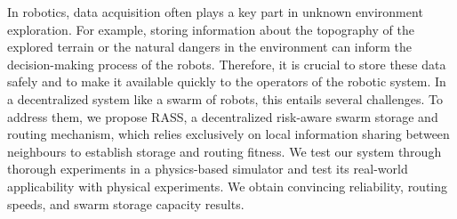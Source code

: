 \label{sec:Theme1}



In robotics, data acquisition often plays a key part in
unknown environment exploration. For example, storing information about the topography of the explored terrain or the natural dangers in the environment can
inform the decision-making process of the robots. 
Therefore, it is crucial to store these data safely
and to make it available quickly to the operators of the robotic
system. In a decentralized system like a swarm of robots, this
entails several challenges. To address them, we propose \ac{RASS}, a
decentralized risk-aware swarm storage and routing mechanism,
which relies exclusively on local information sharing between neighbours to establish
storage and routing fitness. We test our system through thorough experiments in a physics-based simulator and test its real-world applicability with physical experiments. We obtain convincing reliability, routing speeds, and swarm storage capacity results.


